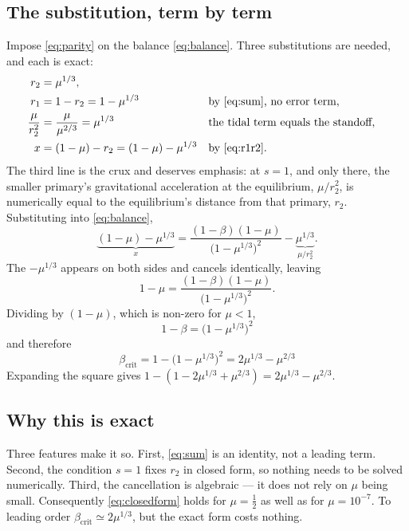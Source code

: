 \documentclass[11pt,a4paper]{article}
\begin{document}
\subsection{The substitution, term by term}

Impose \eqref{eq:parity} on the balance \eqref{eq:balance}. Three substitutions
are needed, and each is exact:
\begin{align}
  r_2 &= \mu^{1/3}, \\
  r_1 &= 1 - r_2 = 1 - \mu^{1/3}
        &&\text{by \eqref{eq:sum}, no error term}, \\
  \frac{\mu}{r_2^2} &= \frac{\mu}{\mu^{2/3}} = \mu^{1/3}
        &&\text{the tidal term equals the standoff}, \\
  x &= (1-\mu) - r_2 = (1-\mu) - \mu^{1/3}
        &&\text{by \eqref{eq:r1r2}} .
\end{align}
The third line is the crux and deserves emphasis: at $s=1$, and only there, the
smaller primary's gravitational acceleration at the equilibrium,
$\mu/r_2^2$, is numerically equal to the equilibrium's distance from that
primary, $r_2$. Substituting into \eqref{eq:balance},
\begin{equation}
  \underbrace{(1-\mu)-\mu^{1/3}}_{x}
  = \frac{(1-\beta)(1-\mu)}{\bigl(1-\mu^{1/3}\bigr)^2}
    - \underbrace{\mu^{1/3}}_{\mu/r_2^2} .
\end{equation}
The $-\mu^{1/3}$ appears on both sides and cancels identically, leaving
\begin{equation}
  1-\mu = \frac{(1-\beta)(1-\mu)}{\bigl(1-\mu^{1/3}\bigr)^2} .
\end{equation}
Dividing by $(1-\mu)$, which is non-zero for $\mu<1$,
\begin{equation}
  1-\beta = \bigl(1-\mu^{1/3}\bigr)^2
\end{equation}
and therefore
\begin{equation}
  \boxed{\;\beta_{\mathrm{crit}}
   = 1 - \bigl(1-\mu^{1/3}\bigr)^2
   = 2\mu^{1/3} - \mu^{2/3}\;}
  \label{eq:closedform}
\end{equation}
Expanding the square gives $1-(1-2\mu^{1/3}+\mu^{2/3})=2\mu^{1/3}-\mu^{2/3}$.

\subsection{Why this is exact}

Three features make it so. First, \eqref{eq:sum} is an identity, not a leading
term. Second, the condition $s=1$ fixes $r_2$ in closed form, so nothing needs
to be solved numerically. Third, the cancellation is algebraic --- it does not
rely on $\mu$ being small. Consequently \eqref{eq:closedform} holds for
$\mu=\tfrac12$ as well as for $\mu=10^{-7}$. To leading order
$\beta_{\mathrm{crit}}\simeq2\mu^{1/3}$, but the exact form costs nothing.
\end{document}
